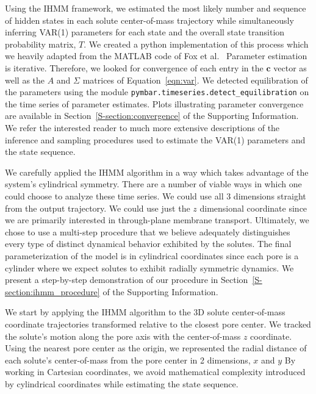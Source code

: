 \documentclass{article}
\begin{document}
  
  Using the IHMM framework, we estimated the most likely number and sequence of hidden
  states in each solute center-of-mass trajectory while simultaneously inferring VAR(1)
  parameters for each state and the overall state transition probability matrix, $T$.
  We created a python implementation of this process which we heavily adapted from
  the MATLAB code of Fox et al.~\cite{fox_sticky_2007} Parameter estimation is iterative. 
  Therefore, we looked for convergence of each entry in the $\mathbf{c}$ vector as well
  as the $A$ and $\Sigma$ matrices of Equation~\ref{eqn:var}. We detected equilibration 
  of the parameters using the module \texttt{pymbar.timeseries.detect\_equilibration} on
  the time series of parameter estimates. Plots illustrating parameter convergence are 
  available in Section~\ref{S-section:convergence} of the Supporting Information. We refer the interested reader to 
  much more extensive descriptions of the inference and sampling procedures used to 
  estimate the VAR(1) parameters and the state sequence. ~\cite{beal_infinite_2002,teh_hierarchical_2006,van_gael_beam_2008,fox_nonparametric_2009,fox_bayesian_2010}

  We carefully applied the IHMM algorithm in a way which takes advantage of the
  system's cylindrical symmetry. There are a number of viable ways in which one 
  could choose to analyze these time series. We could use all 3 dimensions straight
  from the output trajectory. We could use just the $z$ dimensional coordinate 
  since we are primarily interested in through-plane membrane transport. Ultimately, 
  we chose to use a multi-step procedure that we believe adequately distinguishes 
  every type of distinct dynamical behavior exhibited by the solutes. The final
  parameterization of the model is in cylindrical coordinates since each pore is a
  cylinder where we expect solutes to exhibit radially symmetric dynamics. We 
  present a step-by-step demonstration of our procedure in Section~\ref{S-section:ihmm_procedure}
  of the Supporting Information.
  
  We start by applying the IHMM algorithm to the 3D solute center-of-mass coordinate 
  trajectories transformed relative to the closest pore center. We tracked the solute's
  motion along the pore axis with the center-of-mass $z$ coordinate. Using the nearest
  pore center as the origin, we represented the radial distance of each solute's 
  center-of-mass from the pore center in 2 dimensions, $x$ and $y$ 
  By working in Cartesian coordinates, we avoid
  mathematical complexity introduced by cylindrical coordinates while estimating the 
  state sequence.
\end{document}
